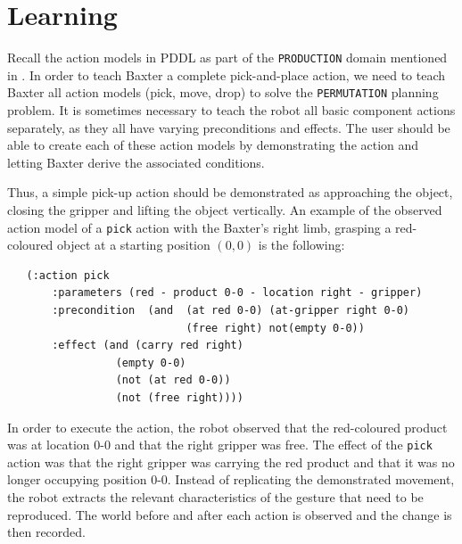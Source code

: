 \section{Learning}
\label{Create an action model}
Recall the action models in PDDL as part of the \texttt{PRODUCTION} domain mentioned in .
In order to teach Baxter a complete pick-and-place action, we need to teach Baxter all action models (pick, move, drop) to solve the \texttt{PERMUTATION} planning problem.
It is sometimes necessary to teach the robot all basic component actions separately, as they all have varying preconditions and effects.
The user should be able to create each of these action models by demonstrating the action and letting Baxter derive the associated conditions.


Thus, a simple pick-up action should be demonstrated as approaching the object, closing the gripper and lifting the object vertically.
An example of the observed action model of a \texttt{pick} action with the Baxter's right limb, grasping a red-coloured object at a starting position $(0,0)$ is the following:

\begin{verbatim}
   (:action pick
       :parameters (red - product 0-0 - location right - gripper)
       :precondition  (and  (at red 0-0) (at-gripper right 0-0) 
                            (free right) not(empty 0-0))
       :effect (and (carry red right)
                 (empty 0-0)
                 (not (at red 0-0)) 
                 (not (free right))))
\end{verbatim}
In order to execute the action, the robot observed that the red-coloured product was at location 0-0 and that the right gripper was free.
The effect of the \texttt{pick} action was that the right gripper was carrying the red product and that it was no longer occupying position 0-0.
Instead of replicating the demonstrated movement, the robot extracts the relevant characteristics of the gesture that need to be reproduced.
The world before and after each action is observed and the change is then recorded.


